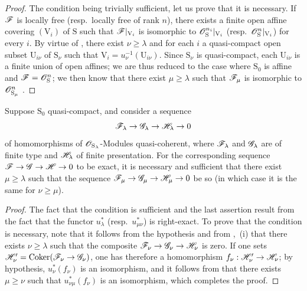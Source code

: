\begin{proof}
The condition being trivially sufficient, let us prove that it is necessary.
If $\mathscr{F}$ is locally free (resp.\ locally free of rank $n$), there exists a finite open affine covering $(\mathrm{V}_i)$ of $\mathrm{S}$ such that $\mathscr{F}|_{\mathrm{V}_i}$ is isomorphic to $\mathscr{O}_\mathrm{S}^{n_i}|_{\mathrm{V}_i}$ (resp.\ $\mathscr{O}_\mathrm{S}^n|_{\mathrm{V}_i}$) for every $i$.
By virtue of , there exist $\nu\geqslant\lambda$ and for each $i$ a quasi-compact open subset $\mathrm{U}_{i\nu}$ of $\mathrm{S}_\nu$ such that $\mathrm{V}_i=u_\nu^{-1}(\mathrm{U}_{i\nu})$.
Since $\mathrm{S}_\nu$ is quasi-compact, each $\mathrm{U}_{i\nu}$ is a finite union of open affines; we are thus reduced to the case where $\mathrm{S}_0$ is affine and $\mathscr{F}=\mathscr{O}_\mathrm{S}^n$; we then know that there exist $\mu\geqslant\lambda$ such that $\mathscr{F}_\mu$ is isomorphic to $\mathscr{O}_{\mathrm{S}_\mu}^n$ .
\end{proof}

\begin{proposition}[8.5.6]
\label{IV.8.5.6}
Suppose $\mathrm{S}_0$ quasi-compact, and consider a sequence
\[
  \mathscr{F}_\lambda\to\mathscr{G}_\lambda\to\mathscr{H}_\lambda\to 0
\]
of homomorphisms of $\mathscr{O}_{\mathrm{S}_\lambda}$-Modules quasi-coherent, where $\mathscr{F}_\lambda$ and $\mathscr{G}_\lambda$ are of finite type and $\mathscr{H}_\lambda$ of finite presentation.
For the corresponding sequence $\mathscr{F}\to\mathscr{G}\to\mathscr{H}\to 0$ to be exact, it is necessary and sufficient that there exist $\mu\geqslant\lambda$ such that the sequence $\mathscr{F}_\mu\to\mathscr{G}_\mu\to\mathscr{H}_\mu\to 0$ be so (in which case it is the same for $\nu\geqslant\mu$).
\end{proposition}

\begin{proof}
The fact that the condition is sufficient and the last assertion result from the fact that the functor $u_\lambda^*$ (resp.\ $u_{\mu\nu}^*$) is right-exact.
To prove that the condition is necessary, note that it follows from the hypothesis and from ,~(i) that there exists $\nu\geqslant\lambda$ such that the composite $\mathscr{F}_\nu\to\mathscr{G}_\nu\to\mathscr{H}_\nu$ is zero.
If one sets $\mathscr{H}'_\nu=\operatorname{Coker}(\mathscr{F}_\nu\to\mathscr{G}_\nu)$, one has therefore a homomorphism $f_\nu:\mathscr{H}'_\nu\to\mathscr{H}_\nu$; by hypothesis, $u_\nu^*(f_\nu)$ is an isomorphism, and it follows from  that there exists $\mu\geqslant\nu$ such that $u_{\nu\mu}^*(f_\nu)$ is an isomorphism, which completes the proof.
\end{proof}

